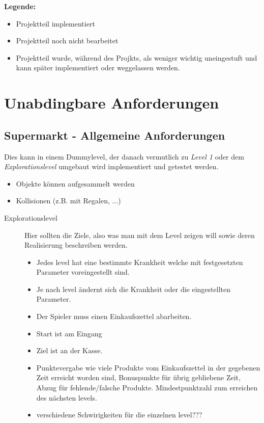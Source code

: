 ﻿\documentclass[a4paper, 11pt]{scrartcl}
\title{\documenttitle}
\author{\authors}
\date{\dateversion}
\newcommand{\fertig}{\color{ForestGreen}}
\newcommand{\unwichtig}{\color{Gray}}
\begin{document}
\maketitle

{\bfseries Legende:}
\begin{itemize}
    \item {\fertig Projektteil implementiert}
    \item {Projektteil noch nicht bearbeitet}
    \item {\unwichtig Projektteil wurde, während des Projkts, als weniger
    wichtig uneingestuft und kann später implementiert oder weggelassen werden.}
\end{itemize}

\section{Unabdingbare Anforderungen}
\subsection{Supermarkt - Allgemeine Anforderungen}
Dies kann in einem Dummylevel, der danach vermutlich zu \emph{Level 1}
oder dem \emph{Explorationslevel} umgebaut wird implementiert und
getestet werden.
\begin{itemize}
    \item Objekte können aufgesammelt werden
    \item Kollisionen (z.B. mit Regalen, ...)
\end{itemize}
%
%
\begin{description}
    \item[Explorationslevel}
    Ein Level in dem man keine Aufgaben erledigen muss aber verschiedene
    Krankheiten testen kann. Dh. man kann zur Laufzeit Krankheiten
    "zu- und abschalten" und diese auch zur Laufzeit dynamisch
    konfigurieren. → GUI
    \item[Level 1]
    Hier sollten die Ziele, also was man mit dem Level zeigen will sowie
    deren Realisierung beschreiben werden.\\
    \begin{itemize}
        \item Jedes level hat eine bestimmte Krankheit welche mit festgesetzten Parameter voreingestellt sind.
        \item Je nach level ändernt sich die Krankheit oder die eingestellten Parameter.
        \item Der Spieler muss einen Einkaufszettel abarbeiten.
        \item Start ist am Eingang
        \item Ziel ist an der Kasse.
        \item Punktevergabe wie viele Produkte vom Einkaufszettel in der gegebenen Zeit erreicht worden sind,             Bonuspunkte für übrig gebliebene Zeit, Abzug für fehlende/falsche Produkte. Mindestpunktzahl zum erreichen         des nächsten levels.
        \item verschiedene Schwirigkeiten für die einzelnen level???
    \end{itemize}
\end{description}
\end{document}

